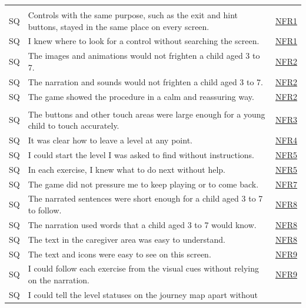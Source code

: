 \documentclass[10pt,titlepage]{article}
\newcounter{surveyq}
\newcommand{\surveyq}{\stepcounter{surveyq}SQ\arabic{surveyq}}
\newcommand{\srsurl}{https://team-hindsight.github.io/ophthamology-game/SRS/SRS.pdf}
\newcommand{\srsnfrref}[2]{\href{\srsurl\#nameddest=#1}{NFR#2}}
\begin{document}
\begin{longtable}{@{}p{}p{}p{}@{}}
\bottomrule
\endlastfoot
\multicolumn{3}{@{}l}{\textit{Look and Feel}}\\
\surveyq & Controls with the same purpose, such as the exit and hint buttons,
  stayed in the same place on every screen. & \srsnfrref{NFR_Layout}{1}\\
\surveyq & I knew where to look for a control without searching the screen. &
  \srsnfrref{NFR_Layout}{1}\\
\surveyq & The images and animations would not frighten a child aged 3 to 7. &
  \srsnfrref{NFR_ChildSafe}{2}\\
\surveyq & The narration and sounds would not frighten a child aged 3 to 7. &
  \srsnfrref{NFR_ChildSafe}{2}\\
\surveyq & The game showed the procedure in a calm and reassuring way. &
  \srsnfrref{NFR_ChildSafe}{2}\\
\addlinespace[4pt]
\multicolumn{3}{@{}l}{\textit{Usability and Humanity}}\\
\surveyq & The buttons and other touch areas were large enough for a young child
  to touch accurately. & \srsnfrref{NFR_TouchTarget}{3}\\
\surveyq & It was clear how to leave a level at any point. &
  \srsnfrref{NFR_Exit}{4}\\
\surveyq & I could start the level I was asked to find without instructions. &
  \srsnfrref{NFR_Usability}{5}\\
\surveyq & In each exercise, I knew what to do next without help. &
  \srsnfrref{NFR_Usability}{5}\\
\surveyq & The game did not pressure me to keep playing or to come back. &
  \srsnfrref{NFR_NoPressure}{7}\\
\surveyq & The narrated sentences were short enough for a child aged 3 to 7 to
  follow. & \srsnfrref{NFR_Language}{8}\\
\surveyq & The narration used words that a child aged 3 to 7 would know. &
  \srsnfrref{NFR_Language}{8}\\
\surveyq & The text in the caregiver area was easy to understand. &
  \srsnfrref{NFR_Language}{8}\\
\surveyq & The text and icons were easy to see on this screen. &
  \srsnfrref{NFR_Accessibility}{9}\\
\surveyq & I could follow each exercise from the visual cues without relying on
  the narration. & \srsnfrref{NFR_Accessibility}{9}\\
\surveyq & I could tell the level statuses on the journey map apart without

\end{longtable}
\end{document}
